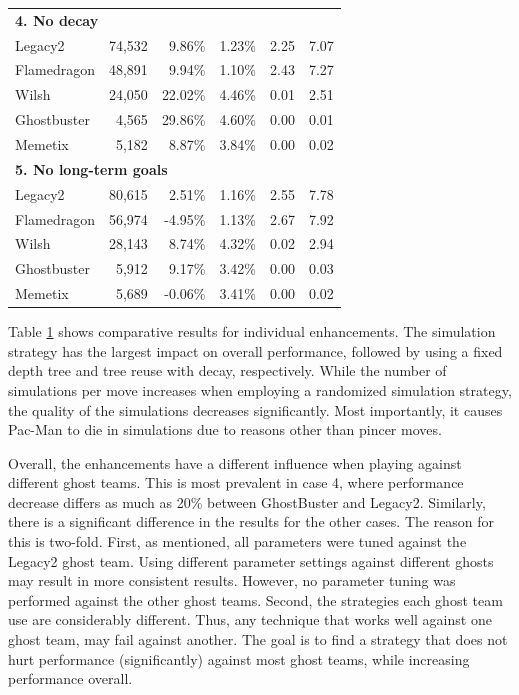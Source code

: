 \documentclass[journal]{IEEEtran}
\begin{document}
\begin{table}[hbp]
\begin{tabular}{lrrrrr}
    \multicolumn{6}{l}{\textbf{4. No decay}} \\
    {\sc Legacy2 } & 74,532 & 9.86\% & 1.23\% & 2.25  & 7.07 \\
    {\sc Flamedragon } & 48,891 & 9.94\% & 1.10\% & 2.43  & 7.27 \\
    {\sc Wilsh } & 24,050 & 22.02\% & 4.46\% & 0.01  & 2.51 \\
    {\sc Ghostbuster } & 4,565 & 29.86\% & 4.60\% & 0.00  & 0.01 \\
    {\sc Memetix } & 5,182 & 8.87\% & 3.84\% & 0.00  & 0.02 \\
    \multicolumn{6}{l}{\textbf{5. No long-term goals}} \\
    {\sc Legacy2 } & 80,615 & 2.51\% & 1.16\% & 2.55  & 7.78 \\
    {\sc Flamedragon } & 56,974 & -4.95\% & 1.13\% & 2.67  & 7.92 \\
    {\sc Wilsh } & 28,143 & 8.74\% & 4.32\% & 0.02  & 2.94 \\
    {\sc Ghostbuster } & 5,912 & 9.17\% & 3.42\% & 0.00  & 0.03 \\
    {\sc Memetix } & 5,689 & -0.06\% & 3.41\% & 0.00  & 0.02 \\
    \bottomrule
    \end{tabular}%
  \label{tab:enhancements}%
\end{table}%

Table \ref{tab:enhancements} shows comparative results for individual enhancements. The simulation strategy has the largest impact on overall performance, followed by using a fixed depth tree and tree reuse with decay, respectively. While the number of simulations per move increases when employing a randomized simulation strategy, the quality of the simulations decreases significantly. Most importantly, it causes Pac-Man to die in simulations due to reasons other than pincer moves.

Overall, the enhancements have a different influence when playing against different ghost teams. This is most prevalent in case 4, where performance decrease differs as much as 20\% between {\sc GhostBuster} and {\sc Legacy2}. Similarly, there is a significant difference in the results for the other cases. The reason for this is two-fold. First, as mentioned, all parameters were tuned against the {\sc Legacy2} ghost team. Using different parameter settings against different ghosts may result in more consistent results. However, no parameter tuning was performed against the other ghost teams. Second, the strategies each ghost team use are considerably different. Thus, any technique that works well against one ghost team, may fail against another. The goal is to find a strategy that does not hurt performance (significantly) against most ghost teams, while increasing performance overall.
\end{document}
